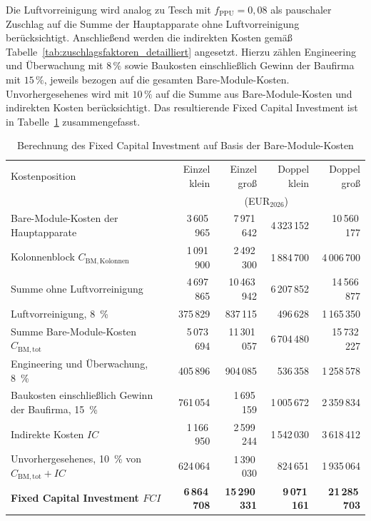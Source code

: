Die Luftvorreinigung wird analog zu Tesch mit \(f_\mathrm{PPU}=0{,}08\) als
pauschaler Zuschlag auf die Summe der Hauptapparate ohne Luftvorreinigung
berücksichtigt. Anschließend werden die indirekten Kosten gemäß
Tabelle~\ref{tab:zuschlagsfaktoren_detailliert} angesetzt. Hierzu zählen
Engineering und Überwachung mit \(8\,\%\) sowie Baukosten einschließlich Gewinn
der Baufirma mit \(15\,\%\), jeweils bezogen auf die gesamten
Bare-Module-Kosten. Unvorhergesehenes wird mit \(10\,\%\) auf die Summe aus
Bare-Module-Kosten und indirekten Kosten berücksichtigt. Das resultierende
Fixed Capital Investment ist in Tabelle~\ref{tab:fci_bare_module}
zusammengefasst.

\begin{table}[H]
\centering
\caption{Berechnung des Fixed Capital Investment auf Basis der Bare-Module-Kosten}
\label{tab:fci_bare_module}
\small
\begin{tabular}{lrrrr}
\hline
Kostenposition
& Einzel klein
& Einzel groß
& Doppel klein
& Doppel groß \\
& \multicolumn{4}{c}{(EUR$_{2026}$)} \\
\hline
Bare-Module-Kosten der Hauptapparate
& 3\,605\,965
& 7\,971\,642
& 4\,323\,152
& 10\,560\,177 \\

Kolonnenblock \(C_{\mathrm{BM,Kolonnen}}\)
& 1\,091\,900
& 2\,492\,300
& 1\,884\,700
& 4\,006\,700 \\
\hline

Summe ohne Luftvorreinigung
& 4\,697\,865
& 10\,463\,942
& 6\,207\,852
& 14\,566\,877 \\

Luftvorreinigung, 8~\%
& 375\,829
& 837\,115
& 496\,628
& 1\,165\,350 \\
\hline

Summe Bare-Module-Kosten \(C_{\mathrm{BM,tot}}\)
& 5\,073\,694
& 11\,301\,057
& 6\,704\,480
& 15\,732\,227 \\

Engineering und Überwachung, 8~\%
& 405\,896
& 904\,085
& 536\,358
& 1\,258\,578 \\

Baukosten einschließlich Gewinn der Baufirma, 15~\%
& 761\,054
& 1\,695\,159
& 1\,005\,672
& 2\,359\,834 \\

Indirekte Kosten \(IC\)
& 1\,166\,950
& 2\,599\,244
& 1\,542\,030
& 3\,618\,412 \\

Unvorhergesehenes, 10~\% von \(C_{\mathrm{BM,tot}}+IC\)
& 624\,064
& 1\,390\,030
& 824\,651
& 1\,935\,064 \\
\hline

\textbf{Fixed Capital Investment \(FCI\)}
& \textbf{6\,864\,708}
& \textbf{15\,290\,331}
& \textbf{9\,071\,161}
& \textbf{21\,285\,703} \\
\hline
\end{tabular}
\end{table}

